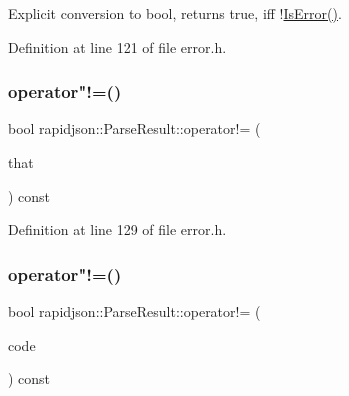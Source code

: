 Explicit conversion to {\ttfamily bool}, returns {\ttfamily true}, iff !\mbox{\hyperlink{structrapidjson_1_1_parse_result_ab6d87c6ce9c849f35e902fbe23f485c4}{Is\+Error()}}. 



Definition at line 121 of file error.\+h.


\begin{DoxyCode}{0}

\end{DoxyCode}
\mbox{\label{structrapidjson_1_1_parse_result_ac58540d291311724829cac7ead1bae79}} 
\subsubsection{\texorpdfstring{operator"!=()}{operator!=()}\hspace{0.1cm}{\footnotesize\ttfamily [1/2]}}
{\footnotesize\ttfamily bool rapidjson\+::\+Parse\+Result\+::operator!= (\begin{DoxyParamCaption}\item[{const \mbox{\hyperlink{structrapidjson_1_1_parse_result}{Parse\+Result}} \&}]{that }\end{DoxyParamCaption}) const}



Definition at line 129 of file error.\+h.


\begin{DoxyCode}{0}

\end{DoxyCode}
\mbox{\label{structrapidjson_1_1_parse_result_a82fc3c16d5b670e8a86630c4feb730c1}} 
\subsubsection{\texorpdfstring{operator"!=()}{operator!=()}\hspace{0.1cm}{\footnotesize\ttfamily [2/2]}}
{\footnotesize\ttfamily bool rapidjson\+::\+Parse\+Result\+::operator!= (\begin{DoxyParamCaption}\item[{\mbox{\hyperlink{group___r_a_p_i_d_j_s_o_n___e_r_r_o_r_s_ga7d3acf640886b1f2552dc8c4cd6dea60}{Parse\+Error\+Code}}}]{code }\end{DoxyParamCaption}) const}



